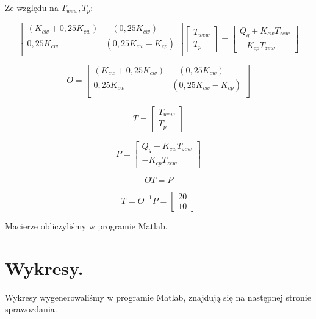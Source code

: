 \documentclass{article}
\begin{document}
\begin{flushleft}
Ze względu na  $T_{wew}, T_{p}$:
\end{flushleft}

$$
\begin{bmatrix}
        (K_{cw}+0,25K_{cw})& -(0,25K_{cw})            \\[0.3em]
        0,25K_{cw} & (0,25K_{cw}-K_{cp})            \\[0.3em]
    \end{bmatrix}
    \begin{bmatrix}
        T_{wew}\\
        T_{p}
    \end{bmatrix}
    =
    \begin{bmatrix}
        Q_{q}+K_{cw}T_{zew}\\
        -K_{cp}T_{zew}
    \end{bmatrix}
$$

$$
O=\begin{bmatrix}
        (K_{cw}+0,25K_{cw})& -(0,25K_{cw})            \\[0.3em]
        0,25K_{cw} & (0,25K_{cw}-K_{cp})            \\[0.3em]
    \end{bmatrix}
$$

$$
T=\begin{bmatrix}
        T_{wew}\\
        T_{p}
    \end{bmatrix}
$$

$$
P=\begin{bmatrix}
        Q_{q}+K_{cw}T_{zew}\\
        -K_{cp}T_{zew}
    \end{bmatrix}
$$

$$
OT=P
$$

$$
T=O^{-1}P=
\begin{bmatrix}
       20 \\
       10
\end{bmatrix}
$$

\begin{flushleft}
Macierze obliczyliśmy w programie Matlab.
\end{flushleft}


\section{Wykresy.}
Wykresy wygenerowaliśmy w programie Matlab, znajdują się na następnej stronie sprawozdania.
\end{document}
